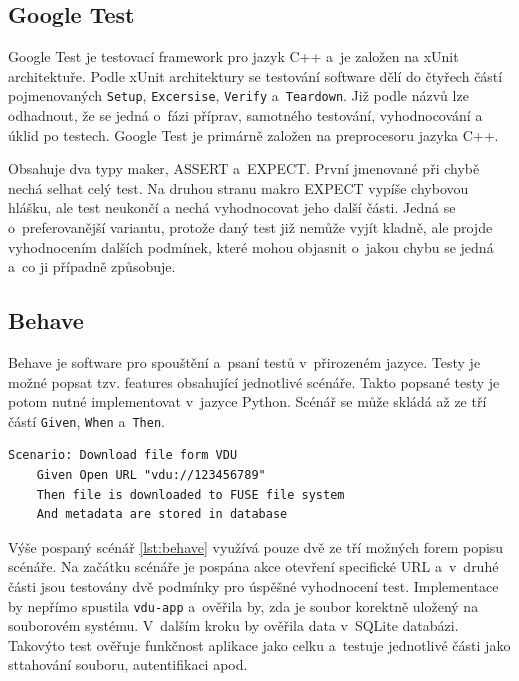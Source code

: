 \subsection{Google Test}

Google Test je testovací framework pro jazyk C++ a je založen na xUnit architektuře. Podle xUnit architektury se testování software dělí do čtyřech částí pojmenovaných
\texttt{Setup}, \texttt{Excersise}, \texttt{Verify} a \texttt{Teardown}. Již podle názvů lze odhadnout, že se jedná o fázi příprav, samotného testování, vyhodnocování 
a úklid po testech. Google Test je primárně založen na preprocesoru jazyka C++.

Obsahuje dva typy maker, ASSERT a EXPECT. První jmenované při chybě nechá selhat celý test. Na druhou stranu makro EXPECT vypíše chybovou hlášku, ale test neukončí a
nechá vyhodnocovat jeho další části. Jedná se o preferovanější variantu, protože daný test již nemůže vyjít kladně, ale projde vyhodnocením dalších podmínek, které
mohou objasnit o jakou chybu se jedná a co ji případně způsobuje. \cite{libgtest}

\subsection{Behave}

Behave je software pro spouštění a psaní testů v přirozeném jazyce. Testy je možné popsat tzv. features obsahující jednotlivé scénáře. Takto popsané testy je
potom nutné implementovat v jazyce Python. Scénář se může skládá až ze tří částí \texttt{Given}, \texttt{When} a \texttt{Then}. \cite{behave}

\begin{lstlisting}[caption={Scénář pro testování stažení souboru z VDU.},label={lst:behave}]
Scenario: Download file form VDU
    Given Open URL "vdu://123456789"
    Then file is downloaded to FUSE file system
    And metadata are stored in database
\end{lstlisting}

Výše pospaný scénář \ref{lst:behave} využívá pouze dvě ze tří možných forem popisu scénáře. Na začátku scénáře je pospána akce otevření specifické URL a v druhé
části jsou testovány dvě podmínky pro úspěšné vyhodnocení test. Implementace by nepřímo spustila \texttt{vdu-app} a ověřila by, zda je soubor korektně uložený
na souborovém systému. V dalším kroku by ověřila data v SQLite databázi. Takovýto test ověřuje funkčnost aplikace jako celku a testuje jednotlivé části jako
sttahování souboru, autentifikaci apod.

